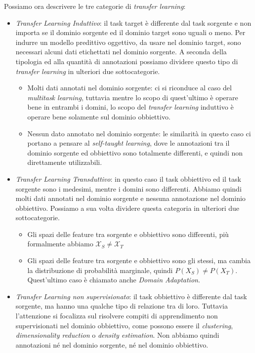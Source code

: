Possiamo ora descrivere le tre categorie di \textit{transfer learning}:
\begin{itemize}
    \item \emph{Transfer Learning Induttivo}: il task target è differente dal task sorgente e non importa se il dominio sorgente ed il dominio target sono uguali o meno. Per indurre un modello predittivo oggettivo, da usare nel dominio target, sono necessari alcuni dati etichettati nel dominio sorgente. A seconda della tipologia ed alla quantità di annotazioni possiamo dividere questo tipo di \textit{transfer learning} in ulteriori due sottocategorie.
    \begin{itemize}
        \item Molti dati annotati nel dominio sorgente: ci si riconduce al caso del \textit{multitask learning}, tuttavia mentre lo scopo di quest'ultimo è operare bene in entrambi i domini, lo scopo del \textit{transfer learning} induttivo è operare bene solamente sul dominio obbiettivo.
        \item Nessun dato annotato nel dominio sorgente: le similarità in questo caso ci portano a pensare al \textit{self-taught learning}, dove le annotazioni tra il dominio sorgente ed obbiettivo sono totalmente differenti, e quindi non direttamente utilizzabili. 
    \end{itemize}
    \item \emph{Transfer Learning Transduttivo}: in questo caso il task obbiettivo ed il task sorgente sono i medesimi, mentre i domini sono differenti. Abbiamo quindi molti dati annotati nel dominio sorgente e nessuna annotazione nel dominio obbiettivo. Possiamo a sua volta dividere questa categoria in ulteriori due sottocategorie.
    \begin{itemize}
        \item Gli spazi delle feature tra sorgente e obbiettivo sono differenti, più formalmente abbiamo $\mathcal{X}_S \neq \mathcal{X}_T$
        \item Gli spazi delle feature tra sorgente e obbiettivo sono gli stessi, ma cambia la distribuzione di probabilità marginale, quindi $P(X_S) \neq P(X_T)$. Quest'ultimo caso è chiamato anche \emph{Domain Adaptation}.
    \end{itemize}
    \item \emph{Transfer Learning non supervisionato}: il task obbiettivo è differente dal task sorgente, ma hanno una qualche tipo di relazione tra di loro. Tuttavia l'attenzione si focalizza sul risolvere compiti di apprendimento non supervisionati nel dominio obbiettivo, come possono essere il \textit{clustering}, \textit{dimensionality reduction} o \textit{density estimation}. Non abbiamo quindi annotazioni né nel dominio sorgente, né nel dominio obbiettivo.
\end{itemize}
